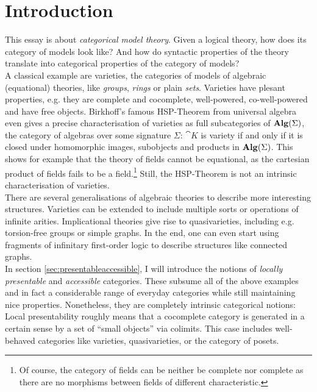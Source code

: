 \section*{Introduction}
{}

This essay is about \emph{categorical model theory}. Given a logical theory, how does its category of models look like? And how do syntactic properties of the theory translate into categorical properties of the category of models? \\

A classical example are varieties, the categories of models of algebraic (equational) theories, like \emph{groups}, \emph{rings} or plain \emph{sets}. Varieties have plesant properties, e.g. they are complete and cocomplete, well-powered, co-well-powered and have free objects. Birkhoff's famous HSP-Theorem from universal algebra even gives a precise characterisation of varieties as full subcategories of $\mathbf{Alg}(\Sigma)$, the category of algebras over some signature $\Sigma$: $\cat K$ is variety if and only if it is closed under homomorphic images, subobjects and products in $\mathbf{Alg}(\Sigma)$. 
This shows for example that the theory of fields cannot be equational, as the cartesian product of fields fails to be a field.\footnote{Of course, the category of fields can be neither be complete nor complete as there are no morphisms between fields of different characteristic.}
Still, the HSP-Theorem is not an intrinsic characterisation of varieties. \\

There are several generalisations of algebraic theories to describe more interesting structures. Varieties can be extended to include multiple sorts or operations of infinite arities. Implicational theories give rise to quasivarieties, including e.g. torsion-free groups or simple graphs. In the end, one can even start using fragments of infinitary first-order logic to describe structures like connected graphs. \\

In section \ref{sec:presentableaccessible}, I will introduce the notions of \emph{locally presentable} and \emph{accessible} categories. These subsume all of the above examples and in fact a considerable range of everyday categories while still maintaining nice properties. Nonetheless, they are completely intrinsic categorical notions: Local presentability roughly means that a cocomplete category is generated in a certain sense by a set of ``small objects'' via colimits. This case includes well-behaved categories like varieties, quasivarieties, or the category of posets. \\

